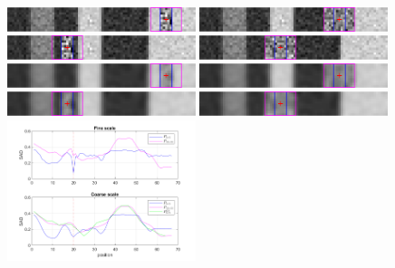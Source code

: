 \documentclass[runningheads]{llncs}
\begin{document}
\begin{figure}[!t]
    \begin{center}
        \includegraphics[width=0.49\textwidth]{figures/high_resolution_success_imL_fine.png}
        \includegraphics[width=0.49\textwidth]{figures/low_resolution_success_imL_fine.png}\\
        \includegraphics[width=0.49\textwidth]{figures/high_resolution_success_imR_fine.png}
        \includegraphics[width=0.49\textwidth]{figures/low_resolution_success_imR_fine.png}\\
        \includegraphics[width=0.49\textwidth]{figures/high_resolution_success_imL_coarse.png}
        \includegraphics[width=0.49\textwidth]{figures/low_resolution_success_imL_coarse.png}\\
        \includegraphics[width=0.49\textwidth]{figures/high_resolution_success_imR_coarse.png}
        \includegraphics[width=0.49\textwidth]{figures/low_resolution_success_imR_coarse.png}\\
        \includegraphics[width=0.49\textwidth]{paper/latex/figures/high_resolution_success_graph.png}

\end{center}
\end{figure}
\end{document}
